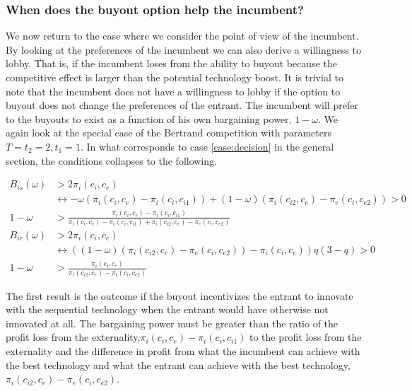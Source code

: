 \subsubsection{When does the buyout option help the incumbent?}

We now return to the case where we consider the point of view of the incumbent. By looking at the preferences of the incumbent we can also derive a willingness to lobby. That is, if the incumbent loses from the ability to buyout because the competitive effect is larger than the potential technology boost. It is trivial to note that the incumbent does not have a willingness to lobby if the option to buyout does not change the preferences of the entrant. The incumbent will prefer to the buyouts to exist as a function of his own bargaining power, $1-\omega$. We again look at the special case of the Bertrand competition with parameters $T=t_2=2,t_1=1$. In what corresponds to case \ref{case:decision} in the general section, the conditions collapses to the following. 

\begin{align*}
B_{is}(\omega)&>2 \pi_i(c_i,c_e) \\
& \leftrightarrow -\omega(\pi_i(c_i,c_{e})- \pi_i(c_i,c_{i1})) 
+(1-\omega)(\pi_i(c_{i2},c_e)-\pi_e(c_{i},c_{e2})) >0 \\
1-\omega &> \frac{\pi_i(c_i,c_{e})- \pi_i(c_i,c_{i1})}{\pi_i(c_i,c_{e})- \pi_i(c_i,c_{i1})+\pi_i(c_{i2},c_e)-\pi_e(c_{i},c_{e2})}
\\
B_{ir}(\omega)&>2 \pi_i(c_i,c_e) \\
& \leftrightarrow ((1-\omega)(\pi_{i}(c_{i2},c_{e})-\pi_{e}(c_{i},c_{e2}))-\pi_i(c_i,c_e)) q(3-q)>0 \\
1-\omega&>\frac{\pi_i(c_i,c_e)}{\pi_i(c_{i2},c_e)-\pi_i(c_{i},c_{e2})}
\end{align*}

The first result is the outcome if the buyout incentivizes the entrant to innovate with the sequential technology when the entrant would have otherwise not innovated at all. The bargaining power must be greater than the ratio of the profit loss from the externality,$\pi_i(c_i,c_{e})- \pi_i(c_i,c_{i1})$ to the profit loss from the externality and the difference in profit from what the incumbent can achieve with the best technology and what the entrant can achieve with the best technology,$\pi_i(c_{i2},c_e)-\pi_e(c_{i},c_{e2})$. 

